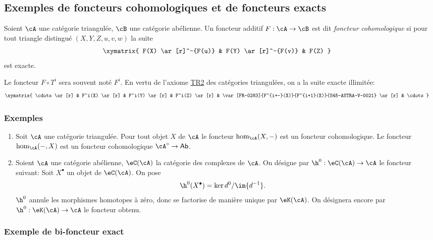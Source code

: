 \subsection{Exemples de foncteurs cohomologiques et de foncteurs exacts}\label{VIII:1-3}





\begin{definition}
Soient $\cA$ une catégorie triangulée, $\cB$ une catégorie abélienne. 
Un foncteur additif $F:\cA\to \cB$ est dit \emph{foncteur cohomologique} si 
pour tout triangle distingué $(X,Y,Z,u,v,w)$ la suite 
\[\xymatrix{
  F(X) \ar[r]^-{F(u)} 
    & F(Y) \ar[r]^-{F(v)} 
    & F(Z) 
}\]
est exacte. 
\end{definition}

Le foncteur $F\circ T^i$ sera souvent noté $F^i$. En vertu de l'axiome 
\hyperlink{VIII:TR2}{TR2} des catégories triangulées, on a la suite 
exacte illimitée: 
\[\xymatrix{
  \cdots \ar[r] 
    & F^i(X) \ar[r] 
    & F^i(Y) \ar[r] 
    & F^i(Z) \ar[r] 
    & \var[FR-0283]{F^{i+-}(X)}{F^{i+1}(X)}{S45-ASTRA-V-0021} \ar[r] 
    & \cdots 
}\]





\subsubsection{Exemples}\label{VIII:1-3-2}

\begin{enumerate}
  \item Soit $\cA$ une catégorie triangulée. Pour tout objet $X$ de $\cA$ 
    le foncteur $\hom_\cA(X,-)$ est un foncteur cohomologique. Le foncteur 
    $\hom_\cA(-,X)$ est un foncteur cohomologique $\cA^\circ\to\mathsf{Ab}$. 
  \item Soient $\cA$ une catégorie abélienne, $\eC(\cA)$ la catégorie des 
    complexes de $\cA$. On désigne par $\h^0:\eC(\cA)\to\cA$ le foncteur 
    suivant: Soit $X^\bullet$ un objet de $\eC(\cA)$. On pose 
    \[
      \h^0(X^\bullet) = \ker d^0 / \im{d^{-1}} \text{.}
    \]
    $\h^0$ annule les morphismes homotopes à zéro, donc se factorise de 
    manière unique par $\eK(\cA)$. On désignera encore par 
    $\h^0:\eK(\cA) \to \cA$ le foncteur obtenu. 
\end{enumerate}





\subsubsection{Exemple de bi-foncteur exact}\label{VIII:1-3-3}

